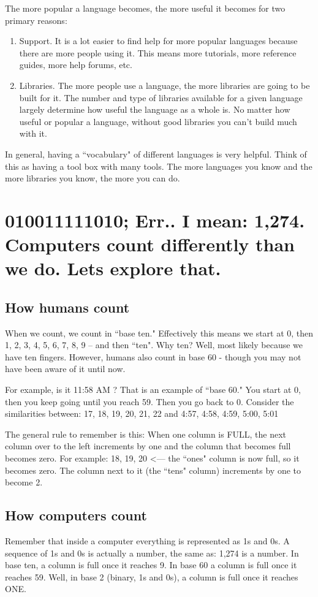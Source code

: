 \documentclass[a4paper,12pt]{article}
\let\stdsection\section
\renewcommand\section{\newpage\stdsection}
\begin{document}
The more popular a language becomes, the more useful it becomes for two primary reasons:
\begin{enumerate}
\item Support. It is a lot easier to find help for more popular languages because there are more people using it. This means more tutorials, more reference guides, more help forums, etc.
\item Libraries. The more people use a language, the more libraries are going to be built for it. The number and type of libraries available for a given language largely determine how useful the language as a whole is. No matter how useful or popular a language, without good libraries you can't build much with it.
\end{enumerate}
In general, having a ``vocabulary" of different languages is very helpful. Think of this as having a tool box with many tools. The more languages you know and the more libraries you know, the more you can do.
\section{010011111010; Err.. I mean: 1,274. Computers count differently than we do. Lets explore that.}
\subsection{How humans count}
When we count, we count in ``base ten." Effectively this means we start at 0, then 1, 2, 3, 4, 5, 6, 7, 8, 9 -- and then ``ten". Why ten? Well, most likely because we have ten fingers. However, humans also count in base 60 - though you may not have been aware of it until now.

For example, is it 11:58 AM ? That is an example of ``base 60." You start at 0, then you keep going until you reach 59. Then you go back to 0. Consider the similarities between:
17, 18, 19, 20, 21, 22
and
4:57, 4:58, 4:59, 5:00, 5:01

The general rule to remember is this: When one column is FULL, the next column over to the left increments by one and the column that becomes full becomes zero. For example:
18, 19, 20 <--- the ``ones" column is now full, so it becomes zero. The column next to it (the ``tens" column) increments by one to become 2.
\subsection{How computers count}
Remember that inside a computer everything is represented as 1s and 0s. A sequence of 1s and 0s is actually a number, the same as: 1,274 is a number. In base ten, a column is full once it reaches 9. In base 60 a column is full once it reaches 59. Well, in base 2 (binary, 1s and 0s), a column is full once it reaches ONE.
\end{document}
